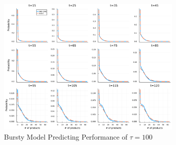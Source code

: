 \documentclass[a4paper,10pt]{article}
\begin{document}
\begin{figure}[h]
	\centering
	\includegraphics[width=0.8\textwidth]{Figs/Bursty_predicting_tau=100.pdf}
	\caption{Bursty Model Predicting Performance of $\tau=100$}\label{Bursty_predicting_tau=100}  
\end{figure}
\clearpage
\newpage
\end{document}

